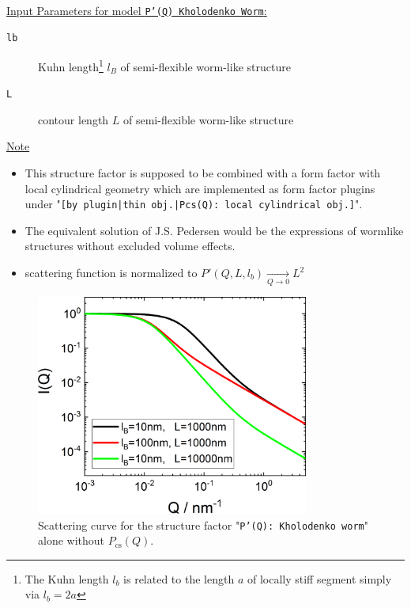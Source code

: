\vspace{5mm}

\hspace{1pt}\\
\underline{Input Parameters for model \texttt{P'(Q) Kholodenko Worm}:}\\
\begin{description}
\item[\texttt{lb}] Kuhn length\footnote{The Kuhn length $l_b$ is related to the length $a$ of
    locally stiff segment simply via $l_b=2a$} $l_B$ of semi-flexible worm-like structure
\item[\texttt{L}] contour length $L$ of semi-flexible worm-like structure
\end{description}

\noindent
\underline{Note}
\begin{itemize}
  \item This structure factor is supposed to be combined with a form factor with local cylindrical geometry which are implemented as form factor plugins
under "\texttt{[by plugin|thin obj.|Pcs(Q): local cylindrical obj.]}".
\item The equivalent solution of J.S. Pedersen \cite{Pedersen96Macrom} would be the expressions of wormlike structures without excluded volume effects.
  \item scattering function is normalized to $P'(Q,L,l_b) \xrightarrow[Q\rightarrow 0]{} L^2$
\end{itemize}

\begin{figure}[htb]
\begin{center}
\includegraphics[width=0.8\textwidth]{../images/form_factor/polymer_semiflexible/PprimeKholodenkoWorm.png}
\end{center}
\caption{Scattering curve for the structure factor "\texttt{P'(Q): Kholodenko worm}" alone without $P_\mathrm{cs}(Q)$.}
\label{fig_IQ:PprimeKholodenkoWorm}
\end{figure}

